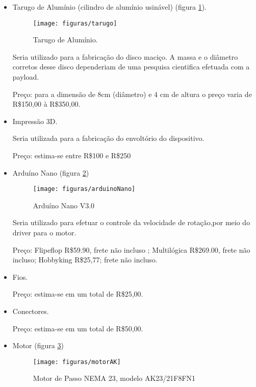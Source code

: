 	\begin{itemize}
		\item Tarugo de Alumínio (cilindro de alumínio usinável) (figura \ref{img:tarugo}).

			\begin{figure}[H]
			  \centering
			  \caption{Tarugo de Alumínio.}
			  \label{img:tarugo}
			  \texttt{[image: figuras/tarugo]}
			\end{figure}

			Seria utilizado para a fabricação do disco maciço. A massa e o diâmetro corretos desse disco dependeriam de uma pesquisa cientifica efetuada com a payload.

			Preço: para a dimensão de 8cm (diâmetro) e 4 cm de altura o preço varia de R\$150,00 à R\$350,00.

		\item Impressão 3D.

			Seria utilizada para a fabricação do envoltório do dispositivo.

			Preço: estima-se entre R\$100 e R\$250

		\item Arduíno Nano (figura \ref{img:arduinoNano})

			\begin{figure}[H]
				\centering
				\caption{Arduíno Nano V3.0}
				\label{img:arduinoNano}
				\texttt{[image: figuras/arduinoNano]}
			\end{figure}

			Seria utilizado para efetuar o controle da velocidade de rotação,por meio do driver para o motor.

			Preço: Flipeflop R\$59.90, frete não incluso ; Multilógica R\$269.00, frete não incluso; Hobbyking R\$25,77; frete não incluso.

		\item Fios.

			Preço: estima-se em um total de R\$25,00.

		\item Conectores.

			Preço: estima-se em um total de R\$50,00.

		\item Motor (figura \ref{img:motorAK})

			\begin{figure}[H]
				\centering
				\caption{Motor de Passo NEMA 23, modelo AK23/21F8FN1}
				\label{img:motorAK}
				\texttt{[image: figuras/motorAK]}
			\end{figure}


\end{itemize}
